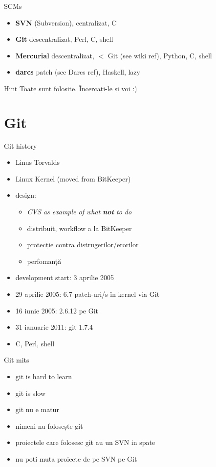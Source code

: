 \documentclass{beamer}
\begin{document}
\begin{frame}{SCMs}
  \begin{itemize}
    \item \textbf{SVN} (Subversion), centralizat, C
    \item \textbf{Git} descentralizat, Perl, C, shell
    \item \textbf{Mercurial} descentralizat, $<$ Git (see wiki ref), Python, C, shell
    \item \textbf{darcs} patch (see Darcs ref), Haskell, lazy
  \end{itemize}
  \pause
  \begin{alertblock}{Hint}
    Toate sunt folosite. Încercați-le și voi :)
  \end{alertblock}
\end{frame}

\section{Git}

\begin{frame}{Git history}
  \begin{itemize}
    \item Linus Torvalds
    \item Linux Kernel (moved from BitKeeper)
    \item design:
      \begin{itemize}
        \item \textit{CVS as example of what \textbf{not} to do}
        \item distribuit, workflow a la BitKeeper
        \item protecție contra distrugerilor/erorilor
        \item perfomanță
      \end{itemize}
    \item development start: 3 aprilie 2005
    \item 29 aprilie 2005: 6.7 patch-uri/s în kernel via Git
    \item 16 iunie 2005: 2.6.12 pe Git
    \item 31 ianuarie 2011: git 1.7.4
    \item C, Perl, shell
  \end{itemize}
\end{frame}

\begin{frame}{Git mits}
  \begin{itemize}[<+->]
    \item git is hard to learn
    \item git is slow
    \item git nu e matur
    \item nimeni nu folosește git
    \item proiectele care folosesc git au un SVN in spate
    \item nu poti muta proiecte de pe SVN pe Git
  \end{itemize}
\end{frame}
\end{document}
